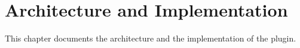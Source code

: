 \section{Architecture and Implementation} \label{architecture}
This chapter documents the architecture and the implementation of the plugin.




